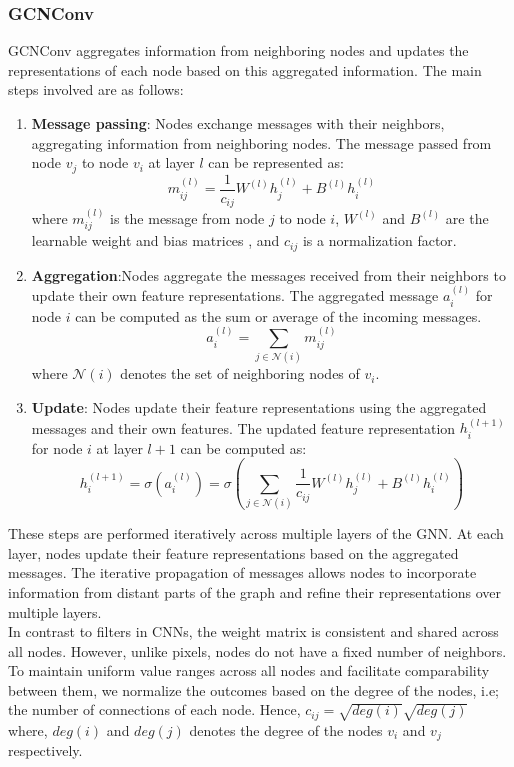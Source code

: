 \subsubsection{GCNConv}
GCNConv aggregates information from neighboring nodes and updates the representations of each node based on this aggregated information. The main steps involved are as follows:
\begin{enumerate} 
    \item \textbf{Message passing}: Nodes exchange messages with their neighbors, aggregating information from neighboring nodes. The message passed from node $v_j$ to node $v_i$ at layer $l$ can be represented as:
        \[ m_{ij}^{(l)} = \frac{1}{c_{ij}} W^{(l)} h_j^{(l)} + B^{(l)} h_i^{(l)}  \]
        where $m_{ij}^{(l)}$ is the message from node $j$ to node $i$, $W^{(l)}$ and $B^{(l)}$ are the learnable weight and bias matrices , and $c_{ij}$ is a normalization factor.
    
    \item \textbf{Aggregation}:Nodes aggregate the messages received from their neighbors to update their own feature representations. The aggregated message $a_i^(l)$ for node $i$ can be computed as the sum or average of the incoming messages.
        \[ a_i^{(l)} = \sum_{j \in \mathcal{N}(i)} m_{ij}^{(l)} \]
    where $\mathcal{N}(i)$ denotes the set of neighboring nodes of $v_i$.
    \item \textbf{Update}: Nodes update their feature representations using the aggregated messages and their own features. The updated feature representation $h_i^{(l+1)}$ for node $i$ at layer $l+1$ can be computed as:
        \[ h_i^{(l+1)} = \sigma(a_i^{(l)}) = \sigma \left(\sum_{j \in \mathcal{N}(i)} \frac{1}{c_{ij}} W^{(l)} h_j^{(l)} + B^{(l)} h_i^{(l)} \right)\]
\end{enumerate}
These steps are performed iteratively across multiple layers of the GNN. At each layer, nodes update their feature representations based on the aggregated messages. The iterative propagation of messages allows nodes to incorporate information from distant parts of the graph and refine their representations over multiple layers. \\In contrast to filters in CNNs, the weight matrix is consistent and shared across all nodes. However, unlike pixels, nodes do not have a fixed number of neighbors. To maintain uniform value ranges across all nodes and facilitate comparability between them, we normalize the outcomes based on the degree of the nodes, i.e; the number of connections of each node. Hence, $c_{ij} = \sqrt{deg(i)}\sqrt{deg(j)}$ where, ${deg(i)}$ and ${deg(j)}$ denotes the degree of the nodes $v_i$ and $v_j$ respectively. 
